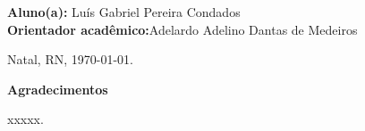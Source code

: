 \documentclass[a4paper, 12pt]{article}
\begin{document}
\normalsize
\vfill

\begin{flushleft}
{\bf Aluno(a):} Luís Gabriel Pereira Condados \\
{\bf Orientador acadêmico:}Adelardo Adelino Dantas de Medeiros\\
\end{flushleft}

\vfill

\begin{center}
Natal, RN, \today.
\end{center}

\newpage


\begin{center}
{\bf \Large Agradecimentos}
\end{center}

xxxxx.

\newpage

\tableofcontents

\newpage

\listoffigures
{}

\newpage
\listoftables
{}

% 







\end{document}
